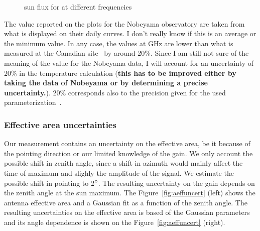 \begin{figure}[!ht]
 \centering
 \hspace*{-3ex}
 \caption{sun flux for at different frequencies}
 \label{fig:sunflux}
\end{figure}
The value reported on the plots for the Nobeyama observatory are taken
from what is  displayed on their daily curves. I  don't really know if
this is an  average or the minimum value.  In any  case, the values at
\unit[2 and  4]{GHz} are lower than  what is measured  at the Canadian
site~\cite{sundata,  sundata2} by around  20\%. Since  I am  still not
sure of the meaning of the value for the Nobeyama data, I will account
for   an  uncertainty   of   20\%  in   the  temperature   calculation
(\textbf{this has to be improved either by taking the data of Nobeyama
  or by determining a precise uncertainty.}). 20\% corresponds also to
the precision given for the used parameterization~\cite{sunparam}.

\subsubsection{Effective area uncertainties}
Our measurement contains  an uncertainty on the effective  area, be it
because  of the  pointing direction  or our  limited knowledge  of the
gain.  We  only account  the possible shift  in zenith angle,  since a
shift in azimuth  would mainly affect the time  of maximum and slighly
the  amplitude of  the  signal.   We estimate  the  possible shift  in
pointing to  2$\rm ^{\circ}$.  The  resulting uncertainty on  the gain
depends   on   the   zenith   angle   at   the   sun   maximum.    The
Figure~\ref{fig:aeffuncert}  (left) shows  the antenna  effective area
and a  Gaussian fit as a  function of the zenith  angle. The resulting
uncertainties  on  the  effective   area  is  based  of  the  Gaussian
parameters   and    its   angle    dependence   is   shown    on   the
Figure~\ref{fig:aeffuncert} (right).

